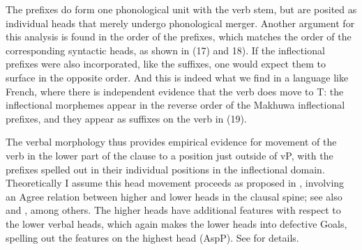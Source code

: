 \documentclass[output=paper
,modfonts
,nonflat]{langsci/langscibook}
\begin{document}
The prefixes do form one phonological unit with the verb stem, but are posited as individual heads that merely undergo phonological merger. Another argument for this analysis is found in the order of the prefixes, which matches the order of the corresponding syntactic heads, as shown in (17) and 18). If the inflectional prefixes were also incorporated, like the suffixes, one would expect them to surface in the opposite order. And this is indeed what we find in a language like French, where there is independent evidence that the verb does move to T: the inflectional morphemes appear in the reverse order of the Makhuwa inflectional prefixes, and they appear as suffixes on the verb in (19).

\begin{figure}[!h]
\begin{exe}
\end{exe} 
\end{figure}
\newpage
{}
The verbal morphology thus provides empirical evidence for movement of the verb in the lower part of the clause to a position just outside of vP, with the prefixes spelled out in their individual positions in the inflectional domain. Theoretically I assume this head movement proceeds as proposed in \citet{Roberts2010}, involving an Agree relation between higher and lower heads in the clausal spine; see also \citet{Adger2003} and \citet{Bjorkman2011}, among others. The higher heads have additional features with respect to the lower verbal heads, which again makes the lower heads into defective Goals, spelling out the features on the highest head (AspP). See \citet{Roberts2010} for details.
\end{document}
